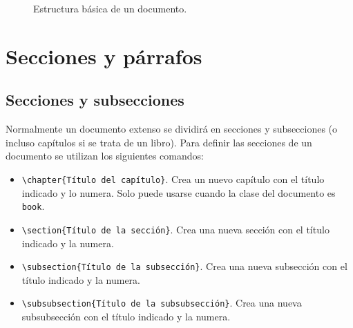 \documentclass[
  a4paper,
]{scrreport}
\providecommand{\tightlist}{%
  \setlength{\itemsep}{0pt}\setlength{\parskip}{0pt}}\usepackage{longtable,booktabs,array}
\theoremstyle{definition}
\theoremstyle{remark}
\begin{document}
\begin{figure}


\caption{\label{fig-overleaf-documento-base}Estructura básica de un
documento.}

\end{figure}%


\chapter{Secciones y párrafos}\label{secciones-y-puxe1rrafos}

\section{Secciones y subsecciones}\label{secciones-y-subsecciones}

Normalmente un documento extenso se dividirá en secciones y subsecciones
(o incluso capítulos si se trata de un libro). Para definir las
secciones de un documento se utilizan los siguientes comandos:

\begin{itemize}
\tightlist
\item
  \texttt{\textbackslash{}chapter\{Título\ del\ capítulo\}}. Crea un
  nuevo capítulo con el título indicado y lo numera. Solo puede usarse
  cuando la clase del documento es \texttt{book}.
\item
  \texttt{\textbackslash{}section\{Título\ de\ la\ sección\}}. Crea una
  nueva sección con el título indicado y la numera.
\item
  \texttt{\textbackslash{}subsection\{Título\ de\ la\ subsección\}}.
  Crea una nueva subsección con el título indicado y la numera.
\item
  \texttt{\textbackslash{}subsubsection\{Título\ de\ la\ subsubsección\}}.
  Crea una nueva subsubsección con el título indicado y la numera.
\end{itemize}
\end{document}
